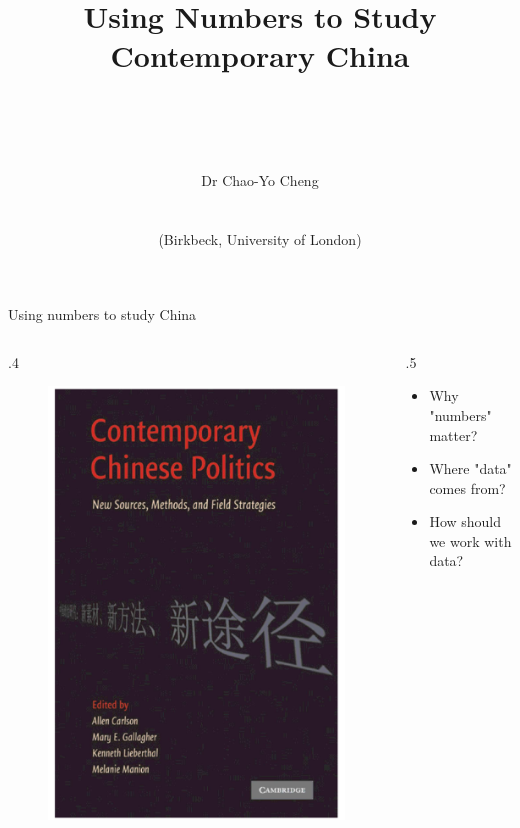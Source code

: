 \documentclass[
  10pt,
  ignorenonframetext,
]{beamer}
\title{\hfill\break
\hfill\break
Using Numbers to Study Contemporary China\\
\strut \\}
\author{Dr Chao-Yo Cheng\\
\strut \\
(Birkbeck, University of London)}
\date{}
\def\begincols{\begin{columns}}
\def\begincol{\begin{column}}
\def\endcol{\end{column}}
\def\endcols{\end{columns}}
\begin{document}
\frame{\titlepage}

\begin{frame}{Using numbers to study China}
\label{using-numbers-to-study-china}
\begincols
  \begincol{.4\textwidth}
    \vspace{0.4cm}
    \begin{figure}
    \centering
    \includegraphics[scale=0.35]{Figs/book_crop}
    \end{figure}
  \endcol
  \begincol{.5\textwidth}
  \hspace{0.3cm}
  \begin{itemize}
    \item Why "numbers" matter?
    \vspace{0.7cm}
    \item Where "data" comes from?
    \vspace{0.7cm}
    \item How should we work with data?
  \end{itemize}
  \endcol
\endcols
\end{frame}
\end{document}
